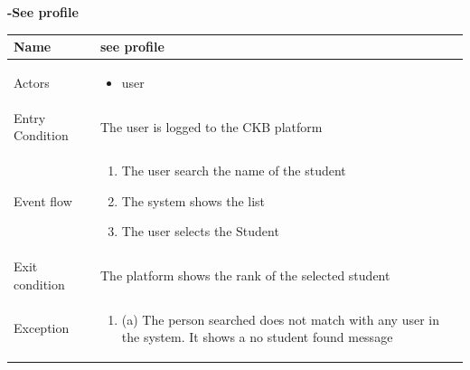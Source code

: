 \begin{enumerate}[label=\textbf{[UC\arabic*]}]
        \item  \textbf{-See profile}
    \\ \begin{tabular}{|l|p{11cm}|}
        \hline
        Name & see profile \\
        \hline
        Actors & \begin{itemize}
                    \item user
                \end{itemize} \\
        \hline
        Entry Condition &  The user is logged to the CKB platform\\
        \hline
        Event flow & \begin{enumerate}
            \item The user search the name of the student
            \item The system shows the list
            \item The user selects the Student
        \end{enumerate}\\
        \hline
        Exit condition & The platform shows the rank of the selected student  
        \\
        \hline
        Exception & \begin{enumerate} [label={}, leftmargin=0.25cm ]
            \item (a) The person searched  does not match with any user in the system. It shows a no student found message
        \end{enumerate}\\ 
        \hline            
    \end{tabular}

\newpage



\end{enumerate}
